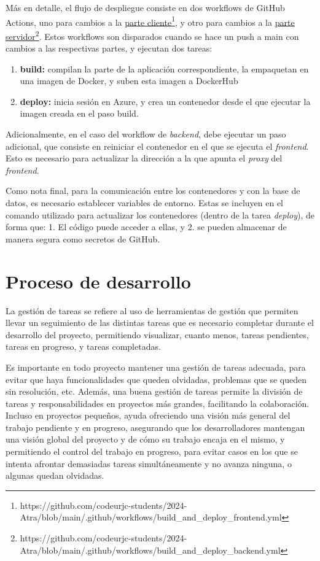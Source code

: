Más en detalle, el flujo de despliegue consiste en dos workflows de GitHub Actions, uno para cambios a la \href{https://github.com/codeurjc-students/2024-Atra/blob/main/.github/workflows/build_and_deploy_frontend.yml}{\uline{parte cliente}\footnote{\url{https://github.com/codeurjc-students/2024-Atra/blob/main/.github/workflows/build_and_deploy_frontend.yml}}}, y otro para cambios a la \href{https://github.com/codeurjc-students/2024-Atra/blob/main/.github/workflows/build_and_deploy_backend.yml}{\uline{parte servidor}\footnote{\url{https://github.com/codeurjc-students/2024-Atra/blob/main/.github/workflows/build_and_deploy_backend.yml}}}. Estos workflows son disparados cuando se hace un push a main con cambios a las respectivas partes, y ejecutan dos tareas:
\begin{enumerate}
    \item \textbf{build:} compilan la parte de la aplicación correspondiente, la empaquetan en una imagen de Docker, y suben esta imagen a DockerHub 
    \item \textbf{deploy:} inicia sesión en Azure, y crea un contenedor desde el que ejecutar la imagen creada en el paso build.
\end{enumerate}
Adicionalmente, en el caso del workflow de \textit{backend}, debe ejecutar un paso adicional, que consiste en reiniciar el contenedor en el que se ejecuta el \textit{frontend}. Esto es necesario para actualizar la dirección a la que apunta el \textit{proxy} del \textit{frontend}.

Como nota final, para la comunicación entre los contenedores y con la base de datos, es necesario establecer variables de entorno. Estas se incluyen en el comando utilizado para actualizar los contenedores (dentro de la tarea \textit{deploy}), de forma que: 1. El código puede acceder a ellas, y 2. se pueden almacenar de manera segura como secretos de GitHub.

\section{Proceso de desarrollo} 
La gestión de tareas se refiere al uso de herramientas de gestión que permiten llevar un seguimiento de las distintas tareas que es necesario completar durante el desarrollo del proyecto, permitiendo visualizar, cuanto menos, tareas pendientes, tareas en progreso, y tareas completadas.

Es importante en todo proyecto mantener una gestión de tareas adecuada, para evitar que haya funcionalidades que queden olvidadas, problemas que se queden sin resolución, etc. Además, una buena gestión de tareas permite la división de tareas y responsabilidades en proyectos más grandes, facilitando la colaboración. Incluso en proyectos pequeños, ayuda ofreciendo una visión más general del trabajo pendiente y en progreso, asegurando que los desarrolladores mantengan una visión global del proyecto y de cómo su trabajo encaja en el mismo, y permitiendo el control del trabajo en progreso, para evitar casos en los que se intenta afrontar demasiadas tareas simultáneamente y no avanza ninguna, o algunas quedan olvidadas.

